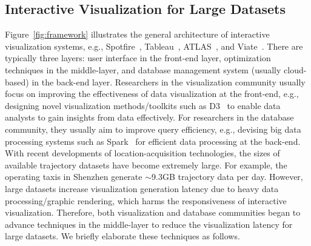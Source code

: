 \subsection{Interactive Visualization for Large Datasets}\label{sec:interactive}

Figure~\ref{fig:framework} illustrates the general architecture of interactive visualization systems,
e.g., Spotfire~\cite{Spotfire}, Tableau~\cite{Tableau}, ATLAS~\cite{chan2008maintaining}, and Viate~\cite{yang2019vaite}.
There are typically three layers: user interface in the front-end layer, optimization techniques in the middle-layer, and database management system (usually cloud-based) in the back-end layer. Researchers in the visualization community usually focus on improving the effectiveness of data visualization at the front-end, e.g., designing novel visualization methods/toolkits such as D3~\cite{d3} to enable data analysts to gain insights from data effectively. For researchers in the database community, they usually aim to improve query efficiency, e.g., devising big data processing systems such as Spark~\cite{spark} for efficient data processing at the back-end. With recent developments of location-acquisition technologies, the sizes of available trajectory datasets have become extremely large. For example, the operating taxis in Shenzhen generate {$\sim$}9.3GB trajectory data per day. However, large datasets increase visualization generation latency due to heavy data processing/graphic rendering, which harms the responsiveness of interactive visualization. Therefore, both visualization and database communities began to advance techniques in the middle-layer to reduce the visualization latency for large datasets. We briefly elaborate these techniques as follows.


